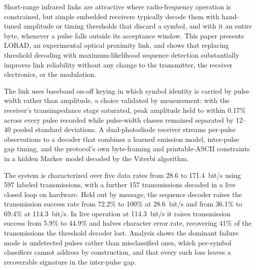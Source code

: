 Short-range infrared links are attractive where radio-frequency operation is
constrained, but simple embedded receivers typically decode them with
hand-tuned amplitude or timing thresholds that discard a symbol, and with it an
entire byte, whenever a pulse falls outside its acceptance window. This paper
presents LORAD, an experimental optical proximity link, and shows that
replacing threshold decoding with maximum-likelihood sequence detection
substantially improves link reliability without any change to the transmitter,
the receiver electronics, or the modulation.

The link uses baseband on-off keying in which symbol identity is carried by
pulse width rather than amplitude, a choice validated by measurement: with the
receiver's transimpedance stage saturated, peak amplitude held to within 0.17\%
across every pulse recorded while pulse-width classes remained separated by
12--40 pooled standard deviations. A dual-photodiode
receiver streams per-pulse observations to a decoder that combines a learned
emission model, inter-pulse gap timing, and the protocol's own byte-framing and
printable-ASCII constraints in a hidden Markov model decoded by the Viterbi
algorithm.

The system is characterized over five data rates from 28.6 to 171.4~bit/s using
597 labeled transmissions, with a further 157 transmissions decoded in a live
closed loop on hardware. Held out by message, the sequence decoder raises the
transmission success rate from 72.2\% to 100\% at 28.6~bit/s and from 36.1\% to 69.4\% at
114.3~bit/s. In live operation at 114.3~bit/s it raises transmission success from
5.9\% to 44.9\% and halves character error rate, recovering 41\% of the
transmissions the threshold decoder lost. Analysis shows the dominant failure
mode is undetected pulses rather than misclassified ones, which per-symbol
classifiers cannot address by construction, and that every such loss leaves a
recoverable signature in the inter-pulse gap.
